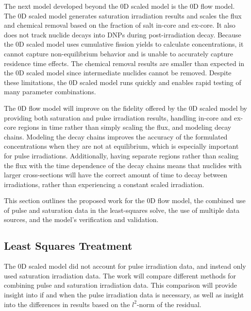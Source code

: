 The next model developed beyond the 0D scaled model is the 0D flow model.
The 0D scaled model generates saturation irradiation results and scales the flux and chemical removal based on the fraction of salt in-core and ex-core.
It also does not track nuclide decays into \glspl{DNP} during post-irradiation decay.
Because the 0D scaled model uses cumulative fission yields to calculate concentrations, it cannot capture non-equilibrium behavior and is unable to accurately capture residence time effects.
The chemical removal results are smaller than expected in the 0D scaled model since intermediate nuclides cannot be removed.
Despite these limitations, the 0D scaled model runs quickly and enables rapid testing of many parameter combinations.

The 0D flow model will improve on the fidelity offered by the 0D scaled model by providing both saturation and pulse irradiation results, handling in-core and ex-core regions in time rather than simply scaling the flux, and modeling decay chains.
Modeling the decay chains improves the accuracy of the formulated concentrations when they are not at equilibrium, which is especially important for pulse irradiations.
Additionally, having separate regions rather than scaling the flux with the time dependence of the decay chains means that nuclides with larger cross-sections will have the correct amount of time to decay between irradiations, rather than experiencing a constant scaled irradiation.

This section outlines the proposed work for the 0D flow model, the combined use of pulse and saturation data in the least-squares solve, the use of multiple data sources, and the model’s verification and validation.


\subsection{Least Squares Treatment}
\label{sec:irrad-combine}

The 0D scaled model did not account for pulse irradiation data, and instead only used saturation irradiation data.
The work will compare different methods for combining pulse and saturation irradiation data.
This comparison will provide insight into if and when the pulse irradiation data is necessary, as well as insight into the differences in results based on the $l^2$-norm of the residual.

